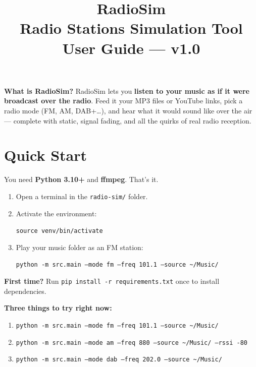 \documentclass[11pt,a4paper]{article}
\title{\vspace{-1cm}\Huge\textcolor{radioBlue}{\textbf{RadioSim}}\\[2mm]
    \Large Radio Stations Simulation Tool\\[2mm]
    \normalsize\textcolor{radioGray}{User Guide {\tiny —} v1.0}}
\author{}
\date{}
\newcommand{\cmd}[1]{\textcolor{radioDark}{\texttt{#1}}}
\begin{document}
\maketitle
\thispagestyle{fancy}

\begin{center}
\begin{tcolorbox}[colback=radioBlue!8, colframe=radioBlue, width=0.92\textwidth,
    left=4mm, right=4mm, top=3mm, bottom=3mm]
    \textbf{What is RadioSim?}\quad
    RadioSim lets you \textbf{listen to your music as if it were broadcast over the radio}.
    Feed it your MP3 files or YouTube links, pick a radio mode (FM, AM, DAB+\dots),
    and hear what it would sound like over the air --- complete with static,
    signal fading, and all the quirks of real radio reception.
\end{tcolorbox}
\end{center}

\section{Quick Start}

You need \textbf{Python 3.10+} and \textbf{ffmpeg}. That's it.

\begin{enumerate}[leftmargin=*]
    \item Open a terminal in the \texttt{radio-sim/} folder.
    \item Activate the environment:
    \begin{center}
        \cmd{source venv/bin/activate}
    \end{center}
    \item Play your music folder as an FM station:
    \begin{center}
        \cmd{python -m src.main --mode fm --freq 101.1 --source \textasciitilde/Music/}
    \end{center}
\end{enumerate}

\begin{tipbox}
    \textbf{First time?} Run \cmd{pip install -r requirements.txt} once to install dependencies.
\end{tipbox}

\vspace{3mm}
\textbf{Three things to try right now:}

\begin{tcolorbox}[colback=radioGreen!8, colframe=radioGreen, left=4mm, right=4mm]
\begin{enumerate}[nosep]
    \item \cmd{python -m src.main --mode fm  --freq 101.1 --source \textasciitilde/Music/}
    \item \cmd{python -m src.main --mode am  --freq 880  --source \textasciitilde/Music/ --rssi -80}
    \item \cmd{python -m src.main --mode dab --freq 202.0 --source \textasciitilde/Music/}
\end{enumerate}
\end{tcolorbox}
\end{document}
